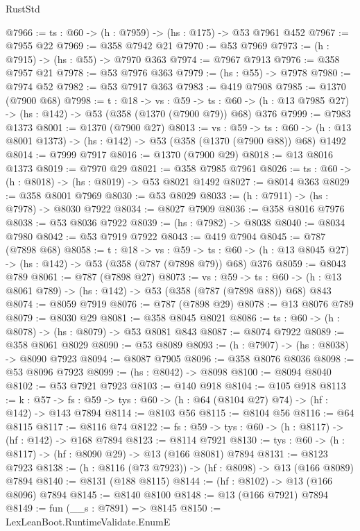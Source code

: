 \begin{lexlean}{RustStd}
\begin{coremodule}
@7966 := {ts : @60} -> (h : @7959) -> (hs : @175) -> @53 @7961 @452
@7967 := @7955 @22
@7969 := @358 @7942 @21
@7970 := @53 @7969
@7973 := (h : @7915) -> (hs : @55) -> @7970 @363
@7974 := @7967 @7913
@7976 := @358 @7957 @21
@7978 := @53 @7976 @363
@7979 := (hs : @55) -> @7978
@7980 := @7974 @52
@7982 := @53 @7917 @363
@7983 := @419 @7908
@7985 := @1370 (@7900 @68)
@7998 := {t : @18} ->
  {vs : @59} ->
  {ts : @60} -> (h : @13 @7985 @27) -> (hs : @142) -> @53 (@358 (@1370 (@7900 @79)) @68) @376
@7999 := @7983 @1373
@8001 := @1370 (@7900 @27)
@8013 := {vs : @59} ->
  {ts : @60} -> (h : @13 @8001 @1373) -> (hs : @142) -> @53 (@358 (@1370 (@7900 @88)) @68) @1492
@8014 := @7999 @7917
@8016 := @1370 (@7900 @29)
@8018 := @13 @8016 @1373
@8019 := @7970 @29
@8021 := @358 @7985 @7961
@8026 := {ts : @60} -> (h : @8018) -> (hs : @8019) -> @53 @8021 @1492
@8027 := @8014 @363
@8029 := @358 @8001 @7969
@8030 := @53 @8029
@8033 := (h : @7911) -> (hs : @7978) -> @8030 @7922
@8034 := @8027 @7909
@8036 := @358 @8016 @7976
@8038 := @53 @8036 @7922
@8039 := (hs : @7982) -> @8038
@8040 := @8034 @7980
@8042 := @53 @7919 @7922
@8043 := @419 @7904
@8045 := @787 (@7898 @68)
@8058 := {t : @18} ->
  {vs : @59} ->
  {ts : @60} -> (h : @13 @8045 @27) -> (hs : @142) -> @53 (@358 (@787 (@7898 @79)) @68) @376
@8059 := @8043 @789
@8061 := @787 (@7898 @27)
@8073 := {vs : @59} ->
  {ts : @60} -> (h : @13 @8061 @789) -> (hs : @142) -> @53 (@358 (@787 (@7898 @88)) @68) @843
@8074 := @8059 @7919
@8076 := @787 (@7898 @29)
@8078 := @13 @8076 @789
@8079 := @8030 @29
@8081 := @358 @8045 @8021
@8086 := {ts : @60} -> (h : @8078) -> (hs : @8079) -> @53 @8081 @843
@8087 := @8074 @7922
@8089 := @358 @8061 @8029
@8090 := @53 @8089
@8093 := (h : @7907) -> (hs : @8038) -> @8090 @7923
@8094 := @8087 @7905
@8096 := @358 @8076 @8036
@8098 := @53 @8096 @7923
@8099 := (hs : @8042) -> @8098
@8100 := @8094 @8040
@8102 := @53 @7921 @7923
@8103 := @140 @918
@8104 := @105 @918
@8113 := {k : @57} ->
  {fs : @59} -> {tys : @60} -> (h : @64 (@8104 @27) @74) -> (hf : @142) -> @143 @7894
@8114 := @8103 @56
@8115 := @8104 @56
@8116 := @64 @8115
@8117 := @8116 @74
@8122 := {fs : @59} -> {tys : @60} -> (h : @8117) -> (hf : @142) -> @168 @7894
@8123 := @8114 @7921
@8130 := {tys : @60} -> (h : @8117) -> (hf : @8090 @29) -> @13 (@166 @8081) @7894
@8131 := @8123 @7923
@8138 := (h : @8116 (@73 @7923)) -> (hf : @8098) -> @13 (@166 @8089) @7894
@8140 := @8131 (@188 @8115)
@8144 := (hf : @8102) -> @13 (@166 @8096) @7894
@8145 := @8140 @8100
@8148 := @13 (@166 @7921) @7894
@8149 := fun (__s : @7891) => @8145
@8150 := LexLeanBoot.RuntimeValidate.EnumE

\end{coremodule}
\end{lexlean}
